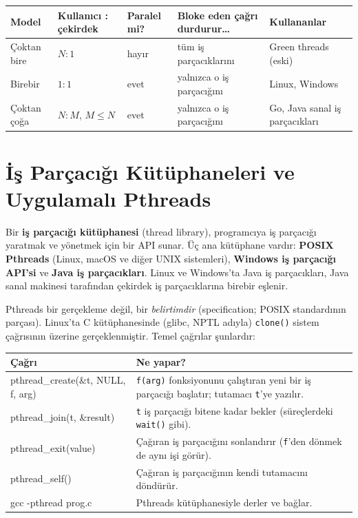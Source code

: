 \documentclass[11pt,a4paper]{article}
\newcommand{\term}[1]{\textbf{\color{mintdeep}#1}}
\newcommand{\cmd}[1]{\texttt{#1}}
\begin{document}
\begin{center}
\renewcommand{\arraystretch}{1.3}
\begin{tabularx}{\linewidth}{@{}l l l >{\raggedright\arraybackslash}X >{\raggedright\arraybackslash}X@{}}
\toprule
\textbf{Model} & \textbf{Kullanıcı : çekirdek} & \textbf{Paralel mi?} & \textbf{Bloke eden çağrı durdurur\dots} & \textbf{Kullananlar} \\
\midrule
Çoktan bire & $N:1$ & hayır & tüm iş parçacıklarını & Green threads (eski) \\
Birebir & $1:1$ & evet & yalnızca o iş parçacığını & Linux, Windows \\
Çoktan çoğa & $N:M$, $M\le N$ & evet & yalnızca o iş parçacığını & Go, Java sanal iş parçacıkları \\
\bottomrule
\end{tabularx}
\end{center}


\section{İş Parçacığı Kütüphaneleri ve Uygulamalı Pthreads}
\label{sec:handson}

Bir \term{iş parçacığı kütüphanesi} (thread library), programcıya iş parçacığı yaratmak ve yönetmek için bir API sunar. Üç ana kütüphane vardır: \textbf{POSIX Pthreads} (Linux, macOS ve diğer UNIX sistemleri), \textbf{Windows iş parçacığı API'si} ve \textbf{Java iş parçacıkları}. Linux ve Windows'ta Java iş parçacıkları, Java sanal makinesi tarafından çekirdek iş parçacıklarına birebir eşlenir.

Pthreads bir gerçekleme değil, bir \emph{belirtimdir} (specification; POSIX standardının parçası). Linux'ta C kütüphanesinde (glibc, NPTL adıyla) \cmd{clone()} sistem çağrısının üzerine gerçeklenmiştir. Temel çağrılar şunlardır:

\begin{center}
\renewcommand{\arraystretch}{1.3}
\begin{tabularx}{\linewidth}{>{\ttfamily}l X}
\toprule
\textrm{\textbf{Çağrı}} & \textbf{Ne yapar?} \\
\midrule
pthread\_create(\&t, NULL, f, arg) & \cmd{f(arg)} fonksiyonunu çalıştıran yeni bir iş parçacığı başlatır; tutamacı \cmd{t}'ye yazılır. \\
pthread\_join(t, \&result) & \cmd{t} iş parçacığı bitene kadar bekler (süreçlerdeki \cmd{wait()} gibi). \\
pthread\_exit(value) & Çağıran iş parçacığını sonlandırır (\cmd{f}'den dönmek de aynı işi görür). \\
pthread\_self() & Çağıran iş parçacığının kendi tutamacını döndürür. \\
gcc -pthread prog.c & Pthreads kütüphanesiyle derler ve bağlar. \\
\bottomrule
\end{tabularx}
\end{center}
\end{document}
